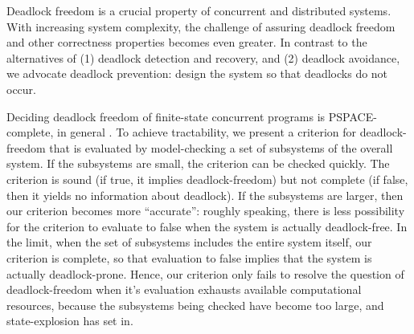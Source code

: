 

Deadlock freedom is a crucial property of concurrent and distributed systems. With increasing system
complexity, the challenge of assuring deadlock freedom and other correctness properties becomes even
greater.  In contrast to the alternatives of (1) deadlock detection and recovery, and (2) deadlock
avoidance, we advocate deadlock prevention: design the system so that deadlocks do not occur.

Deciding deadlock freedom of finite-state concurrent programs is PSPACE-complete, in general
\cite[chapter 19]{papadimitriou1994computational}. To achieve tractability, we present a criterion
for deadlock-freedom that is evaluated by model-checking a set of subsystems of the overall
system. If the subsystems are small, the criterion can be checked
quickly. The criterion is sound (if
true, it implies deadlock-freedom) but not complete (if false, then it yields no information about
deadlock). If the subsystems are larger, then our criterion becomes more ``accurate'': roughly
speaking, there is less possibility for the criterion to evaluate to false when the system is
actually deadlock-free. In the limit, when the set of subsystems includes the entire system itself,
our criterion is complete, so that evaluation to false implies that the system is actually
deadlock-prone. Hence, our criterion only fails to resolve the question of deadlock-freedom 
when it's evaluation exhausts available computational resources, because
the subsystems being checked have become too large, and state-explosion has set in.

